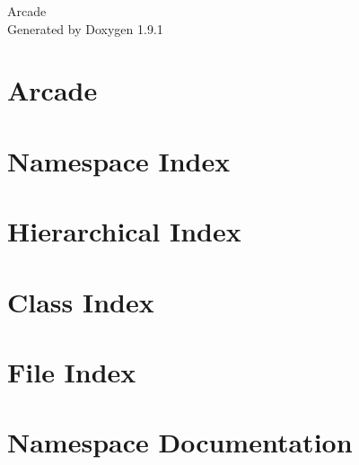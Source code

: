 \let\mypdfximage\pdfximage\def\pdfximage{\immediate\mypdfximage}\documentclass[twoside]{book}
\newcommand{\+}{\discretionary{\mbox{\scriptsize$\hookleftarrow$}}{}{}}
\newcommand{\clearemptydoublepage}{%
  \newpage{\pagestyle{empty}\cleardoublepage}%
}
\begin{document}
\raggedbottom

\hypersetup{pageanchor=false,
             bookmarksnumbered=true,
             pdfencoding=unicode
            }
\begin{titlepage}
\vspace*{7cm}
\begin{center}%
{\Large Arcade }\\
\vspace*{1cm}
{\large Generated by Doxygen 1.9.1}\\
\end{center}
\end{titlepage}
\clearemptydoublepage
{}
\tableofcontents
\clearemptydoublepage
{}
\hypersetup{pageanchor=true}

\chapter{Arcade}
\label{index}\hypertarget{index}{}
\chapter{Namespace Index}

\chapter{Hierarchical Index}

\chapter{Class Index}

\chapter{File Index}

\chapter{Namespace Documentation}

\end{document}

